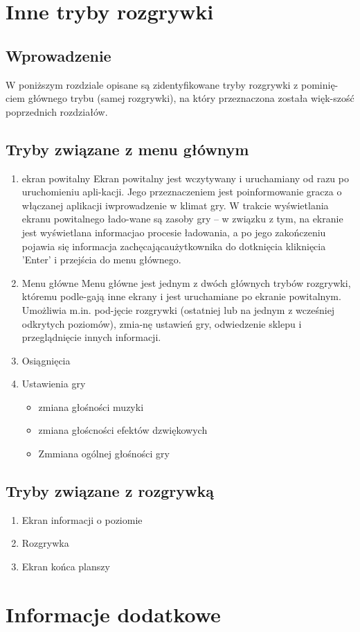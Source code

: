 \documentclass{article}
\begin{document}
\section{Inne tryby rozgrywki}
    \subsection{Wprowadzenie}
    W poniższym rozdziale opisane są zidentyfikowane tryby rozgrywki z pominię-ciem głównego trybu (samej rozgrywki), na który przeznaczona została więk-szość poprzednich rozdziałów.
    
    \subsection{Tryby związane z menu głównym}
    \begin{enumerate}
        \item ekran powitalny
        Ekran powitalny jest wczytywany i uruchamiany od razu po uruchomieniu apli-kacji. Jego przeznaczeniem jest poinformowanie gracza o włączanej aplikacji iwprowadzenie w klimat gry. W trakcie wyświetlania ekranu powitalnego łado-wane są zasoby gry – w związku z tym, na ekranie jest wyświetlana informacjao procesie ładowania, a po jego zakończeniu pojawia się informacja zachęcającaużytkownika do dotknięcia kliknięcia 'Enter' i przejścia do menu głównego.
        \item Menu główne
        Menu główne jest jednym z dwóch głównych trybów rozgrywki, któremu podle-gają inne ekrany i jest uruchamiane po ekranie powitalnym. Umożliwia m.in. pod-jęcie rozgrywki (ostatniej lub na jednym z wcześniej odkrytych poziomów), zmia-nę  ustawień  gry,  odwiedzenie  sklepu  i  przeglądnięcie  innych  informacji. 
        \item Osiągnięcia
        \item Ustawienia gry
        \begin{itemize}
            \item zmiana głośności muzyki
            \item zmiana głoścności efektów dzwiękowych
            \item Zmmiana ogólnej głośności gry
        \end{itemize}
        
    \end{enumerate}
    
    \subsection{Tryby związane z rozgrywką}
    \begin{enumerate}
        \item Ekran informacji o poziomie
        \item Rozgrywka
        \item Ekran końca planszy
        
    \end{enumerate}
        
    
    
    \newpage
    
\section{Informacje dodatkowe}
\end{document}
